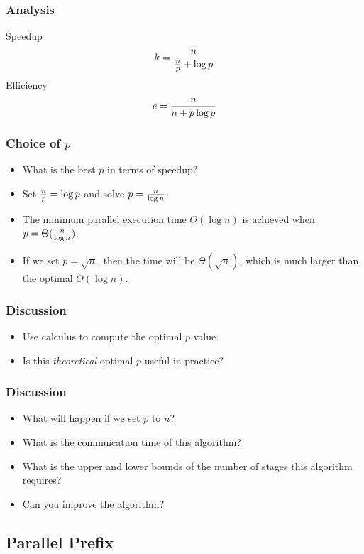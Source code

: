 \documentclass{beamer}
\begin{document}
\begin{CJK}{UTF8}{bsmi}
\begin{frame}
\frametitle{Analysis}
Speedup
\begin{equation}
k = {n \over {{n \over p} + \log p}}
\end{equation}
Efficiency
\begin{equation}
e = {n \over {{n + p \log p}}}
\end{equation}
\end{frame}

\begin{frame}
\frametitle{Choice of $p$}
\begin{itemize}
\item What is the best $p$ in terms of speedup?
\item Set ${n \over p} = \log p$ and solve $p = {n \over {\log n}}$.
\item The minimum parallel execution time $\Theta(\log n)$ is achieved when $p = \Theta({n \over {\log n}})$.
\item If we set $p = \sqrt n$, then the time will be $\Theta(\sqrt n)$, which is much larger than the optimal $\Theta(\log n)$.
\end{itemize}
\end{frame}

\begin{frame}
\frametitle{Discussion}
\begin{itemize}
\item Use calculus to compute the optimal $p$ value.
\item Is this {\em theoretical} optimal $p$ useful in practice?
\end{itemize}
\end{frame}

\begin{frame}
\frametitle{Discussion}
\begin{itemize}
\item What will happen if we set $p$ to $n$?
\item What is the commuication time of this algorithm?
  \item What is the upper and lower bounds of the number of stages this algorithm requires?
\item Can you improve the algorithm?
\end{itemize}
\end{frame}

\subsection{Parallel Prefix}


\end{CJK}
\end{document}
